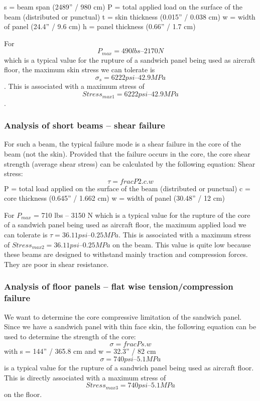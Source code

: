 s = beam span (2489” / 980 cm)
P = total applied load on the surface of the beam (distributed or punctual)
t = skin thickness (0.015” / 0.038 cm)
w = width of panel (24.4” / 9.6 cm)
h = panel thickness (0.66” / 1.7 cm)

For \[ P_{max} = 490 lbs – 2170 N\] which is a typical value for the rupture of a sandwich panel being used as aircraft floor, the maximum skin stress we can tolerate is \[ \sigma_{s} = 6222 psi – 42.9 MPa\].
This is associated with a maximum stress of \[ Stress_{max 1} = 6222 psi – 42.9 MPa\].
\subsubsection{Analysis of short beams – shear failure}
For such a beam, the typical failure mode is a shear failure in the core of the beam (not the skin). Provided that the failure occurs in the core, the core shear strength (average shear stress) can be calculated by the following equation:
Shear stress: \[ \tau = frac{P}{2.c.w} \]
P = total load applied on the surface of the beam (distributed or punctual)
c = core thickness (0.645” / 1.662 cm)
w = width of panel (30.48” / 12 cm)

For $P_{max}$ = 710 lbs – 3150 N which is a typical value for the rupture of the core of a sandwich panel being used as aircraft floor, the maximum applied load we can tolerate is $ \tau = 36.11 psi – 0.25MPa $.
This is associated with a maximum stress of $Stress_{max 2} = 36.11 psi – 0.25 MPa$ on the beam. This value is quite low because these beams are designed to withstand mainly traction and compression forces. They are poor in shear resistance.
\subsubsection{Analysis of floor panels – flat wise tension/compression failure}
We want to determine the core compressive limitation of the sandwich panel. Since we have a sandwich panel with thin face skin, the following equation can be used to determine the strength of the core:
\[ \sigma = frac{P}{s.w} \]
with s = 144” / 365.8 cm and w = 32.3” / 82 cm
\[ \sigma = 740 psi – 5.1 MPa \] is a typical value for the rupture of a sandwich panel being used as aircraft floor. This is directly associated with a maximum stress of \[ Stress_{max 3} = 740 psi – 5.1 MPa \] on the floor.

